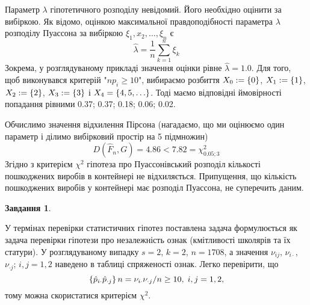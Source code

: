 \documentclass[12pt]{article} %
\newtheorem{prob}{Завдання}
\begin{document}
	Параметр $\lambda$ гіпотетичного розподілу невідомий. Його необхідно оцінити за вибіркою. Як відомо, оцінкою максимальної правдоподібності
	параметра $\lambda$ розподілу Пуассона за вибіркою $\xi_1,x_2,\hdots,\xi_n$ є
	\[\hat{\lambda}=\frac{1}{n}\sum_{k=1}^n\xi_k\]
	Зокрема, у розглядуваному прикладі значення оцінки рівне $\hat{\lambda}=1.0$. Для того, щоб виконувався критерій "$np_i\geq10$",
	вибираємо розбиття $X_0:=\left\{0\right\}$, $X_1:=\left\{1\right\}$, $X_2:=\left\{2\right\}$, $X_3:=\left\{3\right\}$ і $X_4=\left\{4,5,\hdots\right\}$. Тоді маємо 
	відповідні ймовірності попадання рівними 0.37; 0.37; 0.18; 0.06; 0.02.

	Обчислимо значення відхилення Пірсона (нагадаємо, що ми оцінюємо один параметр і ділимо вибірковий простір на 5 підмножин)
	\[D(\hat{F}_n,G)=4.86<7.82=\chi^2_{0.05;3}\]
	Згідно з критерієм $\chi^2$ гіпотеза про Пуассонівський розподіл кількості пошкоджених виробів в контейнері не відхиляється. Припущення,
	що кількість пошкоджених виробів у контейнері має розподіл Пуассона, не суперечить даним.
\begin{prob}\end{prob}
	У термінах перевірки статистичних гіпотез поставлена задача формулюється як задача перевірки гіпотези про незалежність ознак
	(кмітливості школярів та їх статури). У розглядуваному випадку $s=2$, $k=2$, $n=1708$, а значення $\nu_{ij}$, $\nu_{i\cdot}$,
	$\nu_{\cdot j}$; $i,j=1,2$ наведено в таблиці спряженості ознак. Легко перевірити, що
	\[\left\{\hat{p}_{i\cdot}\hat{p}_{\cdot j}\right\}n=\nu_{i\cdot}\nu_{\cdot j}/n\geq10,\;i,j=1,2,\]
	тому можна скористатися критерієм $\chi^2$. 
	
\end{document}
